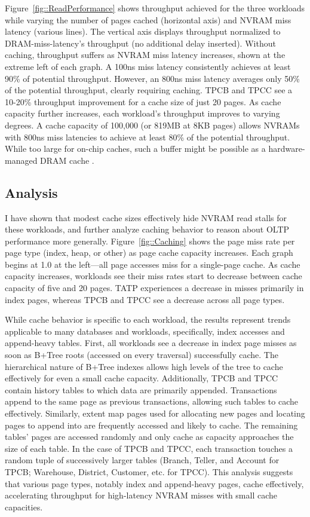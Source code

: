 Figure~\ref{fig::ReadPerformance} shows throughput achieved for the three workloads while varying the number of pages cached (horizontal axis) and NVRAM miss latency (various lines).
The vertical axis displays throughput normalized to DRAM-miss-latency's throughput (no additional delay inserted).
Without caching, throughput suffers as NVRAM miss latency increases, shown at the extreme left of each graph.
A 100ns miss latency consistently achieves at least 90\% of potential throughput.
However, an 800ns miss latency averages only 50\% of the potential throughput, clearly requiring caching.
TPCB and TPCC see a 10-20\% throughput improvement for a cache size of just 20 pages.
As cache capacity further increases, each workload's throughput improves to varying degrees.
A cache capacity of 100,000 (or 819MB at 8KB pages) allows NVRAMs with 800ns miss latencies to achieve at least 80\% of the potential throughput.
While too large for on-chip caches, such a buffer might be possible as a hardware-managed DRAM cache \cite{QureshiSrinivasan09}.

\subsection{Analysis}
\label{sec:OLTP_eval:Reads:Analysis}

I have shown that modest cache sizes effectively hide NVRAM read stalls for these workloads, and further analyze caching behavior to reason about OLTP performance more generally.
Figure~\ref{fig::Caching} shows the page miss rate per page type (index, heap, or other) as page cache capacity increases.
Each graph begins at 1.0 at the left---all page accesses miss for a single-page cache.
As cache capacity increases, workloads see their miss rates start to decrease between cache capacity of five and 20 pages.
TATP experiences a decrease in misses primarily in index pages, whereas TPCB and TPCC see a decrease across all page types.

While cache behavior is specific to each workload, the results represent trends applicable to many databases and workloads, specifically, index accesses and append-heavy tables.
First, all workloads see a decrease in index page misses as soon as B+Tree roots (accessed on every traversal) successfully cache.
The hierarchical nature of B+Tree indexes allows high levels of the tree to cache effectively for even a small cache capacity.
Additionally, TPCB and TPCC contain history tables to which data are primarily appended.
Transactions append to the same page as previous transactions, allowing such tables to cache effectively.
Similarly, extent map pages used for allocating new pages and locating pages to append into are frequently accessed and likely to cache.
The remaining tables' pages are accessed randomly and only cache as capacity approaches the size of each table.
In the case of TPCB and TPCC, each transaction touches a random tuple of successively larger tables (Branch, Teller, and Account for TPCB; Warehouse, District, Customer, etc. for TPCC).
This analysis suggests that various page types, notably index and append-heavy pages, cache effectively, accelerating throughput for high-latency NVRAM misses with small cache capacities.

